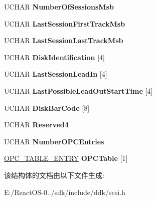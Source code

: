\begin{DoxyCompactItemize}
U\+C\+H\+AR {\bfseries Number\+Of\+Sessions\+Msb}
\item 
\mbox{\label{struct___d_i_s_c___i_n_f_o_r_m_a_t_i_o_n_a35d7cc79ca22ccf82450d4f33499466c}} 
U\+C\+H\+AR {\bfseries Last\+Session\+First\+Track\+Msb}
\item 
\mbox{\label{struct___d_i_s_c___i_n_f_o_r_m_a_t_i_o_n_a5a3d8f0781c806c3fca6b7e9387a4659}} 
U\+C\+H\+AR {\bfseries Last\+Session\+Last\+Track\+Msb}
\item 
\mbox{\label{struct___d_i_s_c___i_n_f_o_r_m_a_t_i_o_n_adb91945e870b74874de17ca26590b805}} 
U\+C\+H\+AR {\bfseries Disk\+Identification} \mbox{[}4\mbox{]}
\item 
\mbox{\label{struct___d_i_s_c___i_n_f_o_r_m_a_t_i_o_n_a2511e33abdbd5107db593881a97cfc65}} 
U\+C\+H\+AR {\bfseries Last\+Session\+Lead\+In} \mbox{[}4\mbox{]}
\item 
\mbox{\label{struct___d_i_s_c___i_n_f_o_r_m_a_t_i_o_n_a9863294cc703642d0c6e67ad27c2f6d1}} 
U\+C\+H\+AR {\bfseries Last\+Possible\+Lead\+Out\+Start\+Time} \mbox{[}4\mbox{]}
\item 
\mbox{\label{struct___d_i_s_c___i_n_f_o_r_m_a_t_i_o_n_a904d4936cb0dd41269dbeb000a557f18}} 
U\+C\+H\+AR {\bfseries Disk\+Bar\+Code} \mbox{[}8\mbox{]}
\item 
\mbox{\label{struct___d_i_s_c___i_n_f_o_r_m_a_t_i_o_n_a656d3ea79d20679e211f19a50952f540}} 
U\+C\+H\+AR {\bfseries Reserved4}
\item 
\mbox{\label{struct___d_i_s_c___i_n_f_o_r_m_a_t_i_o_n_ad3b88b817a3dcf98d8f1618ea40f3486}} 
U\+C\+H\+AR {\bfseries Number\+O\+P\+C\+Entries}
\item 
\mbox{\label{struct___d_i_s_c___i_n_f_o_r_m_a_t_i_o_n_adeb548d3b99d004824eb485f183fc969}} 
\hyperlink{struct___o_p_c___t_a_b_l_e___e_n_t_r_y}{O\+P\+C\+\_\+\+T\+A\+B\+L\+E\+\_\+\+E\+N\+T\+RY} {\bfseries O\+P\+C\+Table} \mbox{[}1\mbox{]}
\end{DoxyCompactItemize}


该结构体的文档由以下文件生成\+:\begin{DoxyCompactItemize}
\item 
E\+:/\+React\+O\+S-\/0../sdk/include/ddk/scsi.\+h\end{DoxyCompactItemize}
